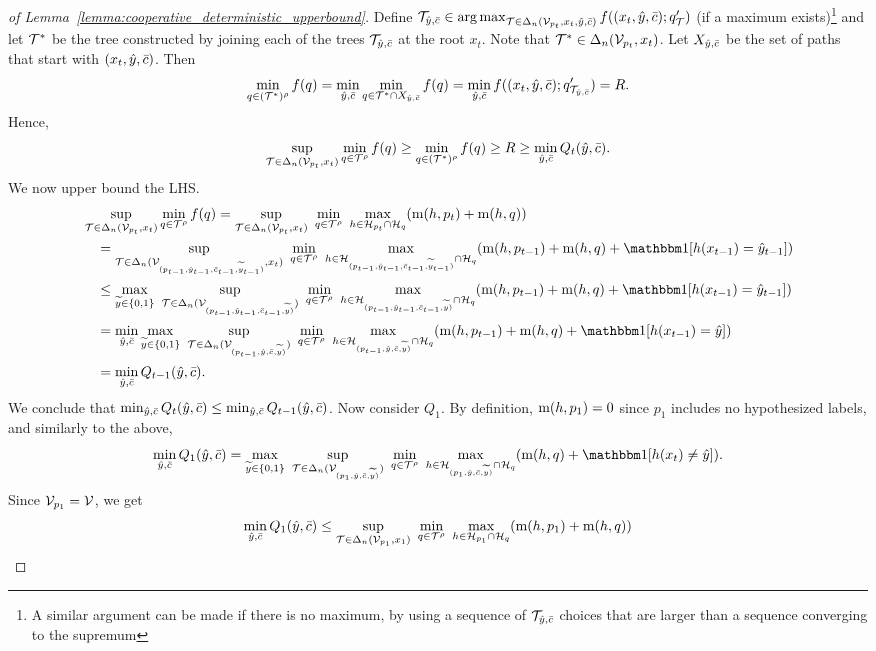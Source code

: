 \documentclass[anon]{alt2027} %
\DeclareMathOperator*{\argmax}{arg\,max}
\begin{document}
\begin{proof}[of Lemma~\ref{lemma:cooperative_deterministic_upperbound}]
Define $\T_{\hy,\sc} \in \argmax_{\T \in \Delta_n(\V_{p_t},x_t,\hy,\sc)}f((x_t,\hy,\sc);q'_\T)$ (if a maximum exists)\footnote{A similar argument can be made if there is no maximum, by using a sequence of ${\mathcal T}_{{\hat{y}},\bar{c}}$ choices that are larger than a sequence converging to the supremum}
and let ${\mathcal T}^*$ be the tree constructed by joining each of the trees ${\mathcal T}_{{\hat{y}},\bar{c}}$ at the root $x_t$. Note that ${\mathcal T}^* \in \Delta_n({\mathcal V}_{p_t},x_t)$. Let $X_{{\hat{y}},\bar{c}}$ be the set of paths that start with $(x_t, {\hat{y}},\bar{c})$.
Then
\[
\min_{q \in ({\mathcal T}^*)^\rho} f(q) = \min_{{\hat{y}},\bar{c}} \min_{q \in {\mathcal T}^*\cap X_{{\hat{y}},\bar{c}}} f(q) = \min_{{\hat{y}},\bar{c}}f((x_t,{\hat{y}},\bar{c});q'_{{\mathcal T}_{{\hat{y}},\bar{c}}}) = R.
\]
Hence,
\[
\sup_{{\mathcal T} \in \Delta_n({\mathcal V}_{p_t},x_t)} \min_{q \in {\mathcal T}^\rho} f(q)  \geq \min_{q \in ({\mathcal T}^*)^\rho} f(q) \geq R \geq \min_{{\hat{y}},\bar{c}}Q_t({\hat{y}},\bar{c}).
\]
We now upper bound the LHS.
\begin{align*}
&\sup_{\T \in \Delta_n(\V_{p_t},x_t)} \min_{q \in \T^\rho} f(q) = \sup_{\T\in\Delta_n(\V_{p_t},x_t)} ~\min_{q\in\T^\rho} ~\max_{h\in \H_{p_t}\cap \H_q} (\mi(h, p_{t}) + \mi(h,q))
  \\
  &\quad= \sup_{\T\in\Delta_n(\V_{(p_{t-1},\hy_{t-1}, \sc_{t-1}, \vy_{t-1})},x_t)} ~\min_{q\in\T^\rho} ~\max_{h\in \H_{(p_{t-1},\hy_{t-1}, \sc_{t-1}, \vy_{t-1})}\cap \H_q} (\mi(h, p_{t-1}) + \mi(h,q)+\indct[h(x_{t-1}) = \hy_{t-1}])
  \\
  &\quad\leq \max_{\vy\in\{0,1\}} ~\sup_{\T\in\Delta_n(\V_{(p_{t-1},\hy_{t-1}, \sc_{t-1}, \vy)})} ~\min_{q\in\T^\rho} ~\max_{h\in \H_{(p_{t-1},\hy_{t-1}, \sc_{t-1}, \vy)}\cap \H_q} (\mi(h, p_{t-1}) + \mi(h,q)+\indct[h(x_{t-1}) = \hy_{t-1}])
\\   
  &\quad=\min_{\hy,\sc}\max_{\vy\in\{0,1\}} ~\sup_{\T\in\Delta_n(\V_{(p_{t-1},\hy, \sc, \vy)})} ~\min_{q\in\T^\rho} ~\max_{h\in \H_{(p_{t-1},\hy, \sc, \vy)}\cap \H_q} (\mi(h, p_{t-1}) + \mi(h,q)+\indct[h(x_{t-1}) = \hy]) \\
  &\quad= \min_{\hy,\sc}Q_{t-1}(\hy,\sc).
\end{align*}
We conclude that $\min_{{\hat{y}},\bar{c}}Q_{t}({\hat{y}},\bar{c}) \leq \min_{{\hat{y}},\bar{c}}Q_{t-1}({\hat{y}},\bar{c})$. Now consider $Q_1$. By definition, $\mathrm{m}(h, p_1) = 0$ since $p_1$ includes no hypothesized labels, and 
similarly to the above,
\[
\min_{\hy,\sc}Q_1(\hy, \sc) = \max_{\vy\in\{0,1\}} ~\sup_{\T\in\Delta_n(\V_{(p_1,\hy, \sc, \vy)})} ~\min_{q\in\T^\rho} ~\max_{h\in \H_{(p_1,\hy, \sc, \vy)}\cap \H_q} (\mi(h,q) +\indct[h(x_t) \neq \hy]).
\]
Since ${\mathcal V}_{p_1} = {\mathcal V}$, we get
\begin{align*}
\min_{\hy,\sc}Q_1(\hy, \sc) &\leq \sup_{\T\in\Delta_n(\V_{p_1},x_1)} ~\min_{q\in\T^\rho} ~\max_{h\in \H_{p_1}\cap \H_q} (\mi(h, p_{1}) + \mi(h,q)) \\

\end{align*}
\end{proof}
\end{document}

